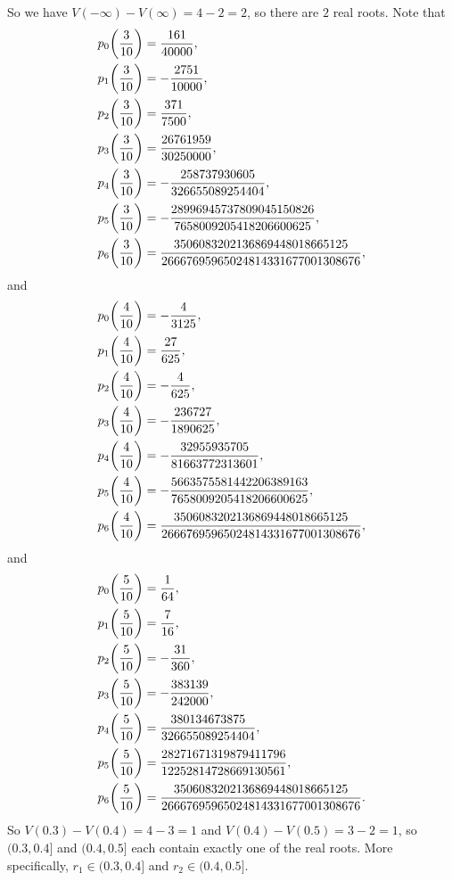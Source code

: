 \documentclass[preprint,12pt,authoryear]{elsarticle}
\DeclarePairedDelimiter{\iop}{(}{)}
\newcommand{\p}{\iop*}
\begin{document}
So we have $V(-\infty)-V(\infty)=4-2=2$, so there are $2$ real roots. Note that
\begin{align*}
    p_0\p{\frac{3}{10}}&=\frac{161}{40000},\\
    p_1\p{\frac{3}{10}}&=-\frac{2751}{10000},\\
    p_2\p{\frac{3}{10}}&=\frac{371}{7500},\\
    p_3\p{\frac{3}{10}}&=\frac{26761959}{30250000},\\
    p_4\p{\frac{3}{10}}&=-\frac{258737930605}{326655089254404},\\
    p_5\p{\frac{3}{10}}&=-\frac{28996945737809045150826}{7658009205418206600625},\\
    p_6\p{\frac{3}{10}}&=\frac{3506083202136869448018665125}{26667695965024814331677001308676},
\end{align*}
and
\begin{align*}
    p_0\p{\frac{4}{10}}&=-\frac{4}{3125},\\
    p_1\p{\frac{4}{10}}&=\frac{27}{625},\\
    p_2\p{\frac{4}{10}}&=-\frac{4}{625},\\
    p_3\p{\frac{4}{10}}&=-\frac{236727}{1890625},\\
    p_4\p{\frac{4}{10}}&=-\frac{32955935705}{81663772313601},\\
    p_5\p{\frac{4}{10}}&=-\frac{5663575581442206389163}{7658009205418206600625},\\
    p_6\p{\frac{4}{10}}&=\frac{3506083202136869448018665125}{26667695965024814331677001308676},
\end{align*}
and
\begin{align*}
    p_0\p{\frac{5}{10}}&=\frac{1}{64},\\
    p_1\p{\frac{5}{10}}&=\frac{7}{16},\\
    p_2\p{\frac{5}{10}}&=-\frac{31}{360},\\
    p_3\p{\frac{5}{10}}&=-\frac{383139}{242000},\\
    p_4\p{\frac{5}{10}}&=\frac{380134673875}{326655089254404},\\
    p_5\p{\frac{5}{10}}&=\frac{28271671319879411796}{12252814728669130561},\\
    p_6\p{\frac{5}{10}}&=\frac{3506083202136869448018665125}{26667695965024814331677001308676}.
\end{align*}
So $V(0.3)-V(0.4)=4-3=1$ and $V(0.4)-V(0.5)=3-2=1$, so $(0.3,0.4]$ and $(0.4,0.5]$ each contain exactly one of the real roots. More specifically, $r_1\in(0.3,0.4]$ and $r_2\in(0.4,0.5]$.
\end{document}
